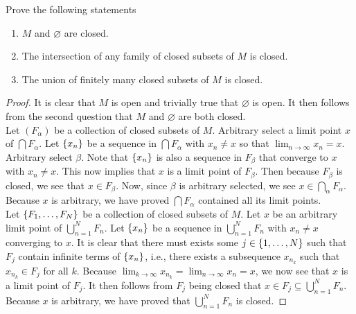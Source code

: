 \documentclass{report}
\begin{document}
\begin{question}{}{}
Prove the following statements 
\begin{enumerate}[label=(\alph*)]
  \item $M$ and $\varnothing$ are closed. 
  \item The intersection of any family of closed subsets of $M$ is closed.  
  \item The union of finitely many closed subsets of $M$ is closed.
\end{enumerate}
\end{question}
\begin{proof}
It is clear that $M$ is open and trivially true that $\varnothing$ is open. It then follows from the second question that $M$ and  $\varnothing$ are both closed. \\

Let $(F_\alpha )$ be a collection of closed subsets of $M$. Arbitrary select a limit point $x$ of  $\bigcap  F_\alpha $. Let $\{ x_n \}$ be a sequence in $\bigcap F_\alpha $ with $x_n\neq x$ so that $\lim_{n\to \infty}x_n=x$. Arbitrary select $\beta $. Note that $\{ x_n \}$ is also a sequence in $F_\beta  $ that converge to  $x$ with $x_n\neq x$. This now implies that $x$ is a limit point of $F_\beta  $. Then because $F_\beta  $ is closed, we see that $x\in F_\beta$. Now, since  $\beta $ is arbitrary selected, we see $x\in \bigcap_\alpha F_\alpha $. Because $x$ is arbitrary, we have proved $\bigcap F_\alpha $ contained all its limit points.\\

Let $\{ F_1,\dots ,F_N \}$ be a collection of closed subsets of $M$.  Let $x$ be an arbitrary limit point of $\bigcup_{n=1}^N F_n$. Let $\{ x_n \}$ be a sequence in $\bigcup_{n=1}^N F_n$ with $x_n\neq x$ converging to $x$. It is clear that there must exists some $j \in \{ 1,\dots ,N \}$  such that $F_j$ contain infinite terms of $\{ x_n \}$, i.e., there exists a subsequence $x_{n_k}$ such that $x_{n_k} \in F_j$ for all $k$. Because  $\lim_{k\to \infty}x_{n_k}=\lim_{n\to \infty}x_n=x$, we now see that $x$ is a limit point of  $F_j$. It then follows from  $F_j$ being closed that $x\in F_j \subseteq\bigcup_{n=1}^N F_n$. Because $x$ is arbitrary, we have proved that $\bigcup_{n=1}^N F_n$ is closed.
\end{proof}
\end{document}
